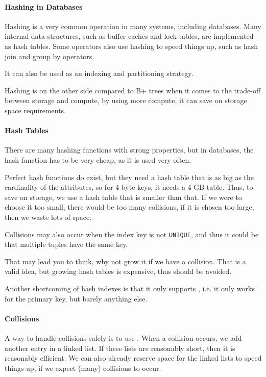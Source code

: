\paragraph{Hashing in Databases}
Hashing is a very common operation in many systems, including databases.
Many internal data structures, such as buffer caches and lock tables, are implemented as hash tables.
Some operators also use hashing to speed things up, such as hash join and group by operators.

It can also be used as an indexing and partitioning strategy.

Hashing is on the other side compared to B+ trees when it comes to the trade-off between storage and compute,
by using more compute, it can save on storage space requirements.


\paragraph{Hash Tables}
There are many hashing functions with strong properties, but in databases, the hash function has to be very cheap, as it is used very often.

Perfect hash functions do exist, but they need a hash table that is as big as the cardinality of the attributes,
so for 4 byte keys, it needs a 4 GB table.
Thus, to save on storage, we use a hash table that is smaller than that.
If we were to choose it too small, there would be too many collisions, if it is chosen too large, then we waste lots of space.

Collisions may also occur when the index key is not \texttt{UNIQUE}, and thus it could be that multiple tuples have the same key.

That may lead you to think, why not grow it if we have a collision. That is a valid idea, but growing hash tables is expensive, thus should be avoided.

Another shortcoming of hash indexes is that it only supports , i.e. it only works for the primary key, but barely anything else.


\paragraph{Collisions}
A way to handle collisions safely is to use . When a collision occurs, we add another entry in a linked list.
If these lists are reasonably short, then it is reasonably efficient. We can also already reserve space for the linked lists to speed things up,
if we expect (many) collisions to occur.

